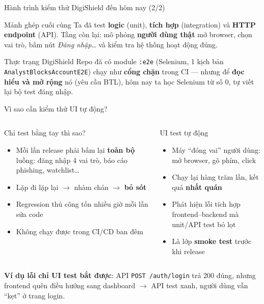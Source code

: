 \documentclass[aspectratio=169,12pt]{beamer}
\begin{document}
\begin{frame}{Hành trình kiểm thử DigiShield đến hôm nay (2/2)}
  \begin{block}{Mảnh ghép cuối cùng}
    Ta đã test \textbf{logic} (unit), \textbf{tích hợp} (integration) và
    \textbf{HTTP endpoint} (API). Tầng còn lại: mô phỏng
    \textbf{người dùng thật} mở browser, chọn vai trò, bấm nút
    \emph{Đăng nhập}\ldots{} và kiểm tra hệ thống hoạt động đúng.
  \end{block}

  \begin{alertblock}{Thực trạng DigiShield}
    Repo đã có module \texttt{:e2e} (Selenium, 1 kịch bản
    \texttt{AnalystBlocksAccountE2E}) chạy như \textbf{cổng chặn} trong CI
    --- nhưng để \textbf{đọc hiểu và mở rộng} nó (yêu cầu BTL), hôm nay ta
    học Selenium từ số 0, tự viết lại bộ test đăng nhập.
  \end{alertblock}
\end{frame}

\begin{frame}{Vì sao cần kiểm thử UI tự động?}
  \begin{columns}[T]
    \begin{block}{Chỉ test bằng tay thì sao?}
      \begin{itemize}
        \item Mỗi lần release phải bấm lại \textbf{toàn bộ} luồng:
              đăng nhập 4 vai trò, báo cáo phishing, watchlist\ldots
        \item Lặp đi lặp lại $\to$ nhàm chán $\to$ \textbf{bỏ sót}
        \item Regression thủ công tốn nhiều giờ mỗi lần sửa code
        \item Không chạy được trong CI/CD ban đêm
      \end{itemize}
    \end{block}

    \begin{block}{UI test tự động}
      \begin{itemize}
        \item Máy ``đóng vai'' người dùng: mở browser, gõ phím, click
        \item Chạy lại hàng trăm lần, kết quả \textbf{nhất quán}
        \item Phát hiện lỗi tích hợp frontend--backend mà unit/API test bỏ lọt
        \item Là lớp \textbf{smoke test} trước khi release
      \end{itemize}
    \end{block}
  \end{columns}

  \vspace{0.2em}
  {\small \textbf{Ví dụ lỗi chỉ UI test bắt được}: API \texttt{POST /auth/login}
  trả 200 đúng, nhưng frontend quên điều hướng sang dashboard $\to$ API test
  xanh, người dùng vẫn ``kẹt'' ở trang login.}
\end{frame}
\end{document}
